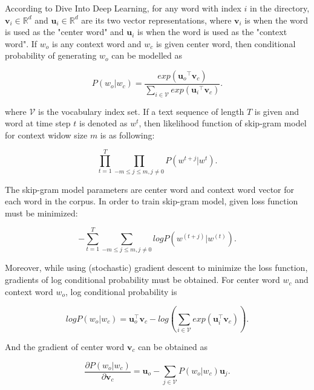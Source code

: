 \documentclass[man]{apa7}
\begin{document}
According to Dive Into Deep Learning, for any word with index $\mathit{i}$ in the directory, $\mathbf{v_\mathit{i}} \in \mathbb{R}^d$ and $\mathbf{u_\mathit{i}} \in \mathbb{R}^d$ are its two vector representations, where $\mathbf{v_\mathit{i}}$ is when the word is used as the "center word" and $\mathbf{u_\mathit{i}}$ is when the word is used as the "context word". If $\mathit{w_o}$ is any context word and $\mathit{w_c}$ is given center word, then conditional probability of generating $\mathit{w_o}$ can be modelled as

\begin{equation}
P(w_o | w_c) = \frac{exp(\mathbf{u_\mathit{o}}^\top \mathbf{v_\mathit{c}})}{\sum_{i \in \mathcal{V}} exp(\mathbf{u_\mathit{i}}^\top \mathbf{v_\mathit{c}})}.
\end{equation}

where $ \mathcal{V}$ is the vocabulary index set. If a text sequence of length $T$ is given and word at time step $t$ is denoted as $\mathit{w}^t$, then likelihood function of skip-gram model for context widow size $m$ is as following:

\begin{equation}
\prod_{t=1}^T \prod_{-m \le j \le m , j \neq 0} P(w^{t+j} | w^t).
\end{equation}

The skip-gram model parameters are center word and context word vector for each word in the corpus. In order to train skip-gram model, given loss function must be minimized:

$$ -\sum_{t=1}^T \sum_{-m \le j \le m, j \neq 0} logP(w^{(t+j)} | w^{(t)}).$$

Moreover, while using (stochastic) gradient descent to minimize the loss function, gradients of log conditional probability must be obtained. For center word $w_c$ and context word $w_o$, log conditional probability is

\begin{equation}
logP(w_o|w_c) = \mathbf{u}_o^\top \mathbf{v}_c - log(\sum_{i \in \mathcal{V}} exp(\mathbf{u}_i^\top \mathbf{v}_c)).
\end{equation}

And the gradient of center word $\mathbf{v}_c$ can be obtained as

\begin{equation}
\frac{\partial P(w_o | w_c)}{\partial \mathbf{v}_c} = \mathbf{u}_o - \sum_{j \in \mathcal{V}} P(w_o|w_c)\mathbf{u}_j.
\end{equation}
\end{document}
